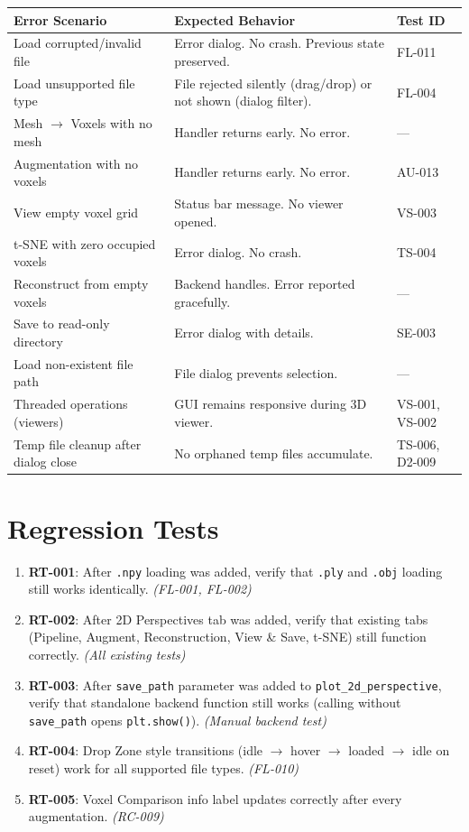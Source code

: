 \documentclass[12pt,a4paper]{article}
\begin{document}
\begin{longtable}{p{4cm}p{8cm}p{3cm}}
\toprule
\textbf{Error Scenario} & \textbf{Expected Behavior} & \textbf{Test ID} \\
\midrule
Load corrupted/invalid file & Error dialog. No crash. Previous state preserved. & FL-011 \\
Load unsupported file type & File rejected silently (drag/drop) or not shown (dialog filter). & FL-004 \\
Mesh $\rightarrow$ Voxels with no mesh & Handler returns early. No error. & --- \\
Augmentation with no voxels & Handler returns early. No error. & AU-013 \\
View empty voxel grid & Status bar message. No viewer opened. & VS-003 \\
t-SNE with zero occupied voxels & Error dialog. No crash. & TS-004 \\
Reconstruct from empty voxels & Backend handles. Error reported gracefully. & --- \\
Save to read-only directory & Error dialog with details. & SE-003 \\
Load non-existent file path & File dialog prevents selection. & --- \\
Threaded operations (viewers) & GUI remains responsive during 3D viewer. & VS-001, VS-002 \\
Temp file cleanup after dialog close & No orphaned temp files accumulate. & TS-006, D2-009 \\
\bottomrule
\end{longtable}

\section{Regression Tests}

\begin{enumerate}[leftmargin=1.5em]
  \item \textbf{RT-001}: After \texttt{.npy} loading was added, verify that \texttt{.ply} and \texttt{.obj} loading still works identically. \hfill\textit{(FL-001, FL-002)}
  \item \textbf{RT-002}: After 2D Perspectives tab was added, verify that existing tabs (Pipeline, Augment, Reconstruction, View \& Save, t-SNE) still function correctly. \hfill\textit{(All existing tests)}
  \item \textbf{RT-003}: After \texttt{save\_path} parameter was added to \texttt{plot\_2d\_perspective}, verify that standalone backend function still works (calling without \texttt{save\_path} opens \texttt{plt.show()}). \hfill\textit{(Manual backend test)}
  \item \textbf{RT-004}: Drop Zone style transitions (idle $\rightarrow$ hover $\rightarrow$ loaded $\rightarrow$ idle on reset) work for all supported file types. \hfill\textit{(FL-010)}
  \item \textbf{RT-005}: Voxel Comparison info label updates correctly after every augmentation. \hfill\textit{(RC-009)}
\end{enumerate}
\end{document}
